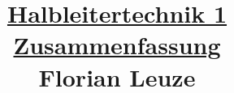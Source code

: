

\null  %
\nointerlineskip  %
\vfill
\let\snewpage \newpage
\let\newpage \relax
\title{\underline{Halbleitertechnik 1 Zusammenfassung} \\ $\;$ \\ $\;$ \\ Florian Leuze}
\date{}
\maketitle
\let \newpage \snewpage
\vfill 
\break %


